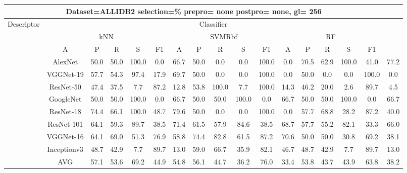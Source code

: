 \documentclass[12pt,italian]{article}
\begin{document}
\begin{tiny}
\begin{longtable}{lcccccccccccccccc}
\toprule
\multicolumn{16}{c}{Dataset=ALLIDB2 selection=\% prepro= none postpro= none, gl= 256} \\ 
\toprule
Descriptor & \multicolumn{15}{c}{Classifier} \\ 
& \multicolumn{5}{c}{kNN} & \multicolumn{5}{c}{SVMRbf} & \multicolumn{5}{c}{RF} \\ 
& A & P & R & S & F1 & A & P & R & S & F1 & A & P & R & S & F1 \\ 
\midrule
& AlexNet & 50.0 & 50.0 & 100.0 &  0.0 & 66.7 & 50.0 &  0.0 &  0.0 & 100.0 &  0.0 & 70.5 & 62.9 & 100.0 & 41.0 & 77.2 \\ 
& VGGNet-19 & 57.7 & 54.3 & 97.4 & 17.9 & 69.7 & 50.0 &  0.0 &  0.0 & 100.0 &  0.0 & 50.0 &  0.0 &  0.0 & 100.0 &  0.0 \\ 
& ResNet-50 & 47.4 & 37.5 &  7.7 & 87.2 & 12.8 & 53.8 & 100.0 &  7.7 & 100.0 & 14.3 & 46.2 & 20.0 &  2.6 & 89.7 &  4.5 \\ 
& GoogleNet & 50.0 & 50.0 & 100.0 &  0.0 & 66.7 & 50.0 & 50.0 & 100.0 &  0.0 & 66.7 & 50.0 & 50.0 & 100.0 &  0.0 & 66.7 \\ 
& ResNet-18 & 74.4 & 66.1 & 100.0 & 48.7 & 79.6 & 50.0 &  0.0 &  0.0 & 100.0 &  0.0 & 57.7 & 68.8 & 28.2 & 87.2 & 40.0 \\ 
& ResNet-101 & 64.1 & 59.3 & 89.7 & 38.5 & 71.4 & 61.5 & 57.9 & 84.6 & 38.5 & 68.7 & 57.7 & 55.2 & 82.1 & 33.3 & 66.0 \\ 
& VGGNet-16 & 64.1 & 69.0 & 51.3 & 76.9 & 58.8 & 74.4 & 82.8 & 61.5 & 87.2 & 70.6 & 50.0 & 50.0 & 30.8 & 69.2 & 38.1 \\ 
& Inceptionv3 & 48.7 & 42.9 &  7.7 & 89.7 & 13.0 & 59.0 & 66.7 & 35.9 & 82.1 & 46.7 & 48.7 & 42.9 &  7.7 & 89.7 & 13.0 \\ 
\hline
& AVG & 57.1 & 53.6 & 69.2 & 44.9 & 54.8 & 56.1 & 44.7 & 36.2 & 76.0 & 33.4 & 53.8 & 43.7 & 43.9 & 63.8 & 38.2 \\ 
\hline
\bottomrule
\end{longtable} 

 \pagebreak 
\end{tiny} 
 
\end{document}
